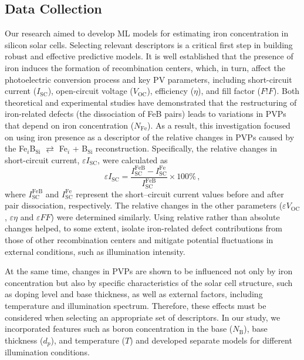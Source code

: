 \documentclass[a4paper,fleqn]{cas-sc}
\begin{document}
\subsection{Data Collection}

Our research aimed to develop ML models for estimating iron concentration in silicon solar cells.
Selecting relevant descriptors is a critical first step in building robust and effective predictive models.
It is well established that the presence of iron induces the formation of recombination centers, which, in turn, affect the photoelectric conversion process and key PV parameters, including short-circuit current ($I_\mathrm{SC}$), open-circuit voltage ($V_\mathrm{OC}$), efficiency ($\eta$), and fill factor ($F!F$).
Both theoretical and experimental studies \cite{FeB:Schmidt,IronSC,Olikh2025MSEB} have demonstrated that the restructuring of iron-related defects (the dissociation of FeB pairs) leads to variations in PVPs that depend on iron concentration ($N_\mathrm{Fe}$).
As a result, this investigation focused on using iron presence as a descriptor of the relative changes in PVPs caused by the
Fe$_i$B$_\mathrm{Si}$ $\rightleftarrows$ Fe$_i$ + B$_\mathrm{Si}$ reconstruction.
Specifically, the relative changes in short-circuit current, $\varepsilon I_\mathrm{SC}$, were calculated as
\begin{equation}
\label{eq1}
    \varepsilon I_\mathrm{SC} = \frac{I_\mathrm{SC}^\mathrm{FeB} - I_\mathrm{SC}^\mathrm{Fe}}{I_\mathrm{SC}^\mathrm{FeB}} \times 100 \%\,,
\end{equation}
where $I_\mathrm{SC}^\mathrm{FeB}$ and $I_\mathrm{SC}^\mathrm{Fe}$ represent the short--circuit current values before and after pair dissociation, respectively.
The relative changes in the other parameters ($\varepsilon V_\mathrm{OC}$, $\varepsilon \eta$ and $\varepsilon F\!F$) were determined similarly.
Using relative rather than absolute changes helped, to some extent,
isolate iron-related defect contributions from those of other recombination centers
and mitigate potential fluctuations in external conditions, such as illumination intensity.

At the same time, changes in PVPs are shown \cite{FeB:Schmidt,Olikh2025MSEB} to be influenced not only by iron concentration
but also by specific characteristics of the solar cell structure, such as doping level and base thickness,
as well as external factors, including temperature and illumination spectrum.
Therefore, these effects must be considered when selecting an appropriate set of descriptors.
In our study, we incorporated features such as boron concentration in the base ($N_\mathrm{B}$), base thickness ($d_p$), and temperature ($T$)
and developed separate models for different illumination conditions.
\end{document}
